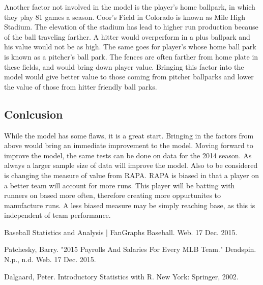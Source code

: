 \documentclass[12pt]{article}
\begin{document}
\qquad Another factor not involved in the model is the player's home ballpark, in which they play 81 games a season. Coor's Field in Colorado is known as Mile High Stadium. The elevation of the stadium has lead to higher run production because of the ball traveling farther. A hitter would overperform in a plus ballpark and his value would not be as high. The same goes for player's whose home ball park is known as a pitcher's ball park. The fences are often farther from home plate in these fields, and would bring down player value. Bringing this factor into the model would give better value to those coming from pitcher ballparks and lower the value of those from hitter friendly ball parks.

\subsection{Conlcusion}
\qquad While the model has some flaws, it is a great start. Bringing in the factors from above would bring an immediate improvement to the model. Moving forward to improve the model, the same tests can be done on data for the 2014 season. As always a larger sample size of data will improve the model. Also to be considered is changing the measure of value from RAPA. RAPA is biased in that a player on a better team will account for more runs. This player will be batting with runners on based more often, therefore creating more oppurtunites to manufacture runs. A less biased measure may be simply reaching base, as this is independent of team performance.



\begin{thebibliography}{1}

 Baseball Statistics and Analysis | FanGraphs Baseball. Web. 17 Dec. 2015.

 Patchesky, Barry. "2015 Payrolls And Salaries For Every MLB Team." Deadspin. N.p., n.d. Web. 17 Dec. 2015.

Dalgaard, Peter. Introductory Statistics with R. New York: Springer, 2002. 

\end{thebibliography}
\end{document}
